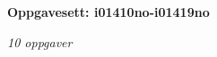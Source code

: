 \centerline{\bf Oppgavesett: i01410no-i01419no}
\vskip 10pt
\centerline{\it 10 oppgaver}\vskip 10pt
\vskip 10pt
